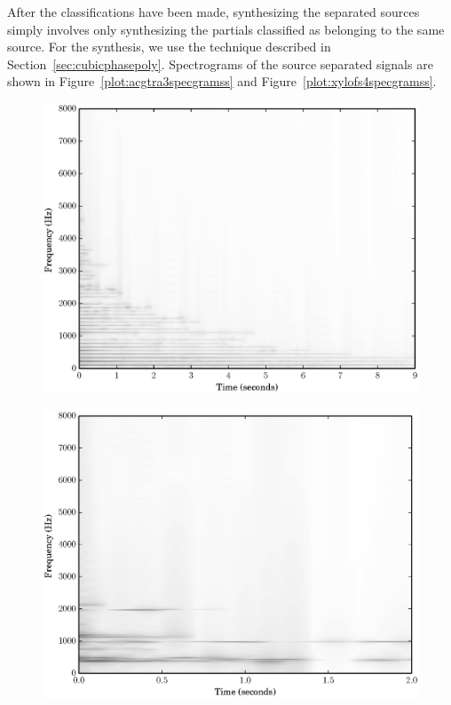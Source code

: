 After the classifications have been made, synthesizing the separated sources
simply involves only synthesizing the partials classified as belonging to the
same source. For the synthesis, we use the technique described in
Section~\ref{sec:cubicphasepoly}. Spectrograms of the source separated signals
are shown in Figure~\ref{plot:acgtra3specgramss} and
Figure~\ref{plot:xylofs4specgramss}. 

\begin{figure}[!t]
    \centering
    \includegraphics[width=\figwidthscale\textwidth]{plots/ac_gtr_ss_spec.eps}
    \CaptionWithTitle{%
    }{\label{plot:acgtra3specgramss}}
\end{figure}

\begin{figure}[!t]
    \centering
    \includegraphics[width=\figwidthscale\textwidth]{plots/xylo_ss_spec.eps}
    \CaptionWithTitle{%
    }{\label{plot:xylofs4specgramss}}
\end{figure}

